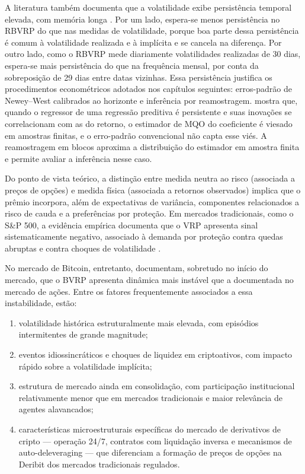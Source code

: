 A literatura também documenta que a volatilidade exibe persistência temporal elevada, com memória longa \citep{corsi2009har}. Por um lado, espera-se menos persistência no RBVRP do que nas medidas de volatilidade, porque boa parte dessa persistência é comum à volatilidade realizada e à implícita e se cancela na diferença. Por outro lado, como o RBVRP mede diariamente volatilidades realizadas de 30 dias, espera-se mais persistência do que na frequência mensal, por conta da sobreposição de 29 dias entre datas vizinhas. Essa persistência justifica os procedimentos econométricos adotados nos capítulos seguintes: erros-padrão de Newey--West calibrados ao horizonte e inferência por reamostragem. \citet{stambaugh1999} mostra que, quando o regressor de uma regressão preditiva é persistente e suas inovações se correlacionam com as do retorno, o estimador de MQO do coeficiente é viesado em amostras finitas, e o erro-padrão convencional não capta esse viés. A reamostragem em blocos aproxima a distribuição do estimador em amostra finita e permite avaliar a inferência nesse caso.

Do ponto de vista teórico, a distinção entre medida neutra ao risco (associada a
preços de opções) e medida física (associada a retornos observados) implica que
o prêmio incorpora, além de expectativas de variância,
componentes relacionados a risco de cauda e a preferências por proteção. Em
mercados tradicionais, como o S\&P 500, a evidência empírica documenta que o VRP
apresenta sinal sistematicamente negativo, associado à demanda por proteção contra
quedas abruptas e contra choques de volatilidade
\citep{pan2006jumpRisk, bollerslev2009expected, carr2009variance, bollerslev2011VRP}.

No mercado de Bitcoin, entretanto, \citet{alexanderImeraj2019} documentam,
sobretudo no início do mercado, que o BVRP apresenta dinâmica mais instável que a documentada no mercado de ações. Entre os
fatores frequentemente associados a essa instabilidade, estão:

\begin{enumerate}
    \item volatilidade histórica estruturalmente mais elevada, com episódios
          intermitentes de grande magnitude;
    \item eventos idiossincráticos e choques de liquidez em criptoativos, com
          impacto rápido sobre a volatilidade implícita;
    \item estrutura de mercado ainda em consolidação, com participação
          institucional relativamente menor que em mercados tradicionais e maior
          relevância de agentes alavancados;
    \item características microestruturais específicas do mercado de derivativos
          de cripto --- operação 24/7, contratos com liquidação inversa e
          mecanismos de auto-deleveraging --- que diferenciam a formação de preços
          de opções na Deribit dos mercados tradicionais regulados.
\end{enumerate}

